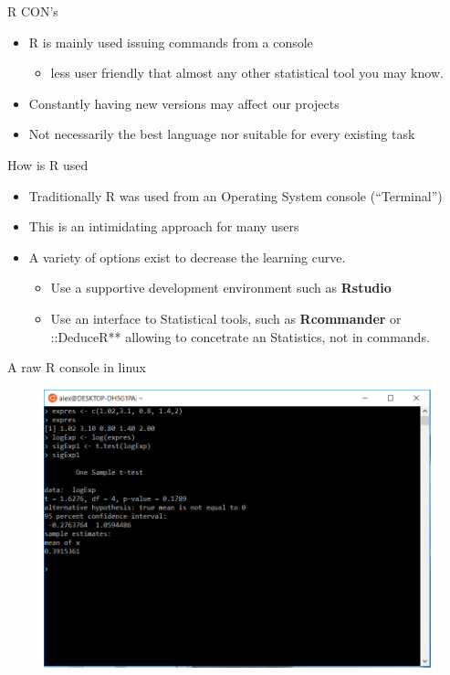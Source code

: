 \documentclass[ignorenonframetext,]{beamer}
\providecommand{\tightlist}{%
  \setlength{\itemsep}{0pt}\setlength{\parskip}{0pt}}
\begin{document}
\begin{frame}{R CON's}

\begin{itemize}
\item
  R is mainly used issuing commands from a console

  \begin{itemize}
  \tightlist
  \item
    less user friendly that almost any other statistical tool you may
    know.
  \end{itemize}
\item
  Constantly having new versions may affect our projects
\item
  Not necessarily the best language nor suitable for every existing task
\end{itemize}

\end{frame}

\begin{frame}{How is R used}

\begin{itemize}
\item
  Traditionally R was used from an Operating System console
  (``Terminal'')
\item
  This is an intimidating approach for many users
\item
  A variety of options exist to decrease the learning curve.

  \begin{itemize}
  \tightlist
  \item
    Use a supportive development environment such as \textbf{Rstudio}
  \item
    Use an interface to Statistical tools, such as \textbf{Rcommander}
    or ::DeduceR** allowing to concetrate an Statistics, not in
    commands.
  \end{itemize}
\end{itemize}

\end{frame}

\begin{frame}{A raw R console in linux}

\begin{figure}
\includegraphics[width=0.85\linewidth]{images/RConsole.png}
\end{figure}

\end{frame}
\end{document}
